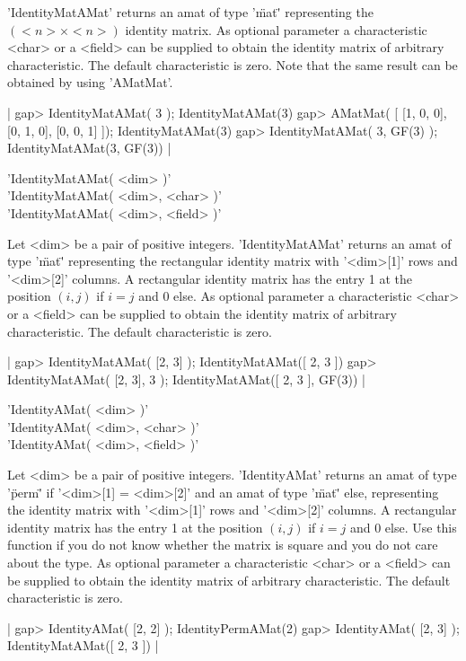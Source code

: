 'IdentityMatAMat' returns an amat of type '\"mat\"' representing
the $(<n>\times<n>)$ identity matrix. As optional parameter 
a characteristic <char> or a <field> can be supplied to obtain 
the identity matrix of arbitrary characteristic. 
The default characteristic is zero. Note that the same result
can be obtained by using 'AMatMat'.

|    gap> IdentityMatAMat( 3 );   
    IdentityMatAMat(3)
    gap> AMatMat( [ [1, 0, 0], [0, 1, 0], [0, 0, 1] ]);
    IdentityMatAMat(3)
    gap> IdentityMatAMat( 3, GF(3) );                  
    IdentityMatAMat(3, GF(3)) |

'IdentityMatAMat( <dim> )'\\
'IdentityMatAMat( <dim>, <char> )'\\
'IdentityMatAMat( <dim>, <field> )'

Let <dim> be a pair of positive integers. 'IdentityMatAMat' returns
an amat of type '\"mat\"' representing the rectangular identity
matrix with '<dim>[1]' rows and '<dim>[2]' columns. A rectangular
identity matrix has the entry 1 at the position $(i,j)$ if $i = j$
and 0 else. As optional parameter a characteristic <char> or a <field> 
can be supplied to obtain the identity matrix of arbitrary characteristic. 
The default characteristic is zero. 

|    gap> IdentityMatAMat( [2, 3] );
    IdentityMatAMat([ 2, 3 ])
    gap> IdentityMatAMat( [2, 3], 3 );
    IdentityMatAMat([ 2, 3 ], GF(3)) |


'IdentityAMat( <dim> )'\\
'IdentityAMat( <dim>, <char> )'\\
'IdentityAMat( <dim>, <field> )'

Let <dim> be a pair of positive integers. 'IdentityAMat' returns an
amat of type '\"perm\"' if '<dim>[1] = <dim>[2]' and an amat of type
'\"mat\"' else, representing the identity matrix with '<dim>[1]' rows
and '<dim>[2]' columns. A rectangular identity matrix has the entry 1
at the position $(i,j)$ if $i = j$ and 0 else. Use this function if
you do not know whether the matrix is square and you do not care about
the type. As optional parameter a characteristic <char> or a <field>
can be supplied to obtain the identity matrix of arbitrary
characteristic. The default characteristic is zero.

|    gap> IdentityAMat( [2, 2] );
    IdentityPermAMat(2)
    gap> IdentityAMat( [2, 3] );
    IdentityMatAMat([ 2, 3 ]) |

